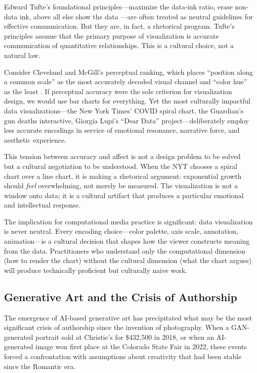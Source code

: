 \documentclass[11pt,a4paper]{article}
\begin{document}
Edward Tufte's foundational principles---maximize the data-ink ratio, erase non-data ink, above all else show the data \citep{tufte1983}---are often treated as neutral guidelines for effective communication. But they are, in fact, a rhetorical program. Tufte's principles assume that the primary purpose of visualization is accurate communication of quantitative relationships. This is a cultural choice, not a natural law.

Consider Cleveland and McGill's perceptual ranking, which places ``position along a common scale'' as the most accurately decoded visual channel and ``color hue'' as the least \citep{cleveland1984}. If perceptual accuracy were the sole criterion for visualization design, we would use bar charts for everything. Yet the most culturally impactful data visualizations---the New York Times' COVID spiral chart, the Guardian's gun deaths interactive, Giorgia Lupi's ``Dear Data'' project---deliberately employ less accurate encodings in service of emotional resonance, narrative force, and aesthetic experience.

This tension between accuracy and affect is not a design problem to be solved but a cultural negotiation to be understood. When the NYT chooses a spiral chart over a line chart, it is making a rhetorical argument: exponential growth should \emph{feel} overwhelming, not merely be measured. The visualization is not a window onto data; it is a cultural artifact that produces a particular emotional and intellectual response.

The implication for computational media practice is significant: data visualization is never neutral. Every encoding choice---color palette, axis scale, annotation, animation---is a cultural decision that shapes how the viewer constructs meaning from the data. Practitioners who understand only the computational dimension (how to render the chart) without the cultural dimension (what the chart argues) will produce technically proficient but culturally naive work.

\subsection{Generative Art and the Crisis of Authorship}

The emergence of AI-based generative art has precipitated what may be the most significant crisis of authorship since the invention of photography. When a GAN-generated portrait sold at Christie's for \$432,500 in 2018, or when an AI-generated image won first place at the Colorado State Fair in 2022, these events forced a confrontation with assumptions about creativity that had been stable since the Romantic era.
\end{document}
